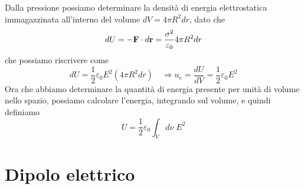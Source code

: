  Dalla pressione possiamo determinare la densit\`a di energia elettrostatica immagazzinata all'interno del volume $dV = 4\pi R^2 dr$, dato che 
 \begin{equation*}
 	dU = - \bold{F} \cdot d \bold{r} = \frac{\sigma^2}{\varepsilon_0} 4 \pi R^2dr
 \end{equation*}
 che possiamo riscrivere come 
 \begin{equation*}
	dU = \frac{1}{2} \varepsilon_0 E^2 (4\pi R^2dr) \quad \Rightarrow  	u_e = \frac{dU}{dV} = \frac{1}{2}\varepsilon_0 E^2
 \end{equation*}
Ora che abbiamo determinare la quantit\`a di energia presente per unit\`a di volume nello spazio, possiamo calcolare l'energia, integrando sul volume, e quindi definiamo
\begin{equation}
	U = \frac{1}{2} \varepsilon_0 \int_{V} d\nu \; E^2
\end{equation}

\section{Dipolo elettrico}

